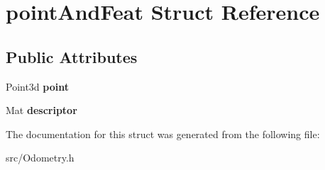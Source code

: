 \hypertarget{structpoint_and_feat}{}\section{point\+And\+Feat Struct Reference}
\label{structpoint_and_feat}
\subsection*{Public Attributes}
\begin{DoxyCompactItemize}
\item 
Point3d {\bfseries point}\hypertarget{structpoint_and_feat_aee9d4bab24f8e1bbea50198bdd6ad761}{}\label{structpoint_and_feat_aee9d4bab24f8e1bbea50198bdd6ad761}

\item 
Mat {\bfseries descriptor}\hypertarget{structpoint_and_feat_a27d1eec7b7fff4e43bda8db96ee734d4}{}\label{structpoint_and_feat_a27d1eec7b7fff4e43bda8db96ee734d4}

\end{DoxyCompactItemize}


The documentation for this struct was generated from the following file\+:\begin{DoxyCompactItemize}
\item 
src/Odometry.\+h\end{DoxyCompactItemize}
